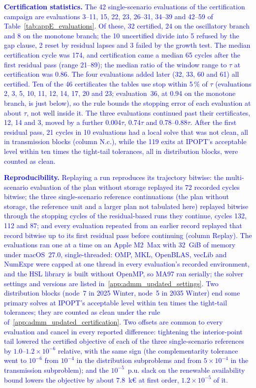 \textcolor{blue}{
    \textbf{Certification statistics.} The 42 single-scenario evaluations of the certification campaign are evaluations 3--11, 15, 22, 23, 26--31, 34--39 and 42--59 of Table~\ref{tab:appE_evaluations}. Of these, 32 certified, 24 on the oscillatory branch and 8 on the monotone branch; the 10 uncertified divide into 5 refused by the gap clause, 2 reset by residual lapses and 3 failed by the growth test. The median certification cycle was 174, and certification came a median 65 cycles after the first residual pass (range 21--89); the median ratio of the window range to $\tau$ at certification was 0.86. The four evaluations added later (32, 33, 60 and 61) all certified. Ten of the 46 certificates the tables use stop within 5\,\% of $\tau$ (evaluations 2, 3, 5, 10, 11, 12, 14, 17, 20 and 23; evaluation~36, at 0.94 on the monotone branch, is just below), so the rule bounds the stopping error of each evaluation at about $\tau$, not well inside it. The three evaluations continued past their certificates, 12, 14 and 3, moved by a further 0.004$\tau$, 0.74$\tau$ and 0.78--0.88$\tau$. After the first residual pass, 21 cycles in 10 evaluations had a local solve that was not clean, all in transmission blocks (column N.c.), while the 119 exits at IPOPT's acceptable level within ten times the tight-tail tolerances, all in distribution blocks, were counted as clean.
}

\textcolor{blue}{
    \textbf{Reproducibility.} Replaying a run reproduces its trajectory bitwise: the multi-scenario evaluation of the plan without storage replayed its 72 recorded cycles bitwise; the three single-scenario reference continuations (the plan without storage, the reference unit and a larger plan not tabulated here) replayed bitwise through the stopping cycles of the residual-based runs they continue, cycles 132, 112 and 87; and every evaluation repeated from an earlier record replayed that record bitwise up to its first residual pass before continuing (column Replay). The evaluations ran one at a time on an Apple M2~Max with 32~GiB of memory under macOS~27.0, single-threaded: OMP, MKL, OpenBLAS, vecLib and NumExpr were capped at one thread in every evaluation's recorded environment, and the HSL library is built without OpenMP, so MA97 ran serially; the solver settings and versions are listed in~\ref{app:admm_updated_settings}. Two distribution blocks (node~7 in 2025 Winter, node~5 in 2035 Winter) end some primary solves at IPOPT's acceptable level within ten times the tight-tail tolerances; they are counted as clean under the rule of~\ref{app:admm_updated_certification}. Two offsets are common to every evaluation and cancel in every reported difference: tightening the interior-point tail lowered the certified objective of each of the three single-scenario references by $1.0$--$1.2 \times 10^{-6}$ relative, with the same sign (the complementarity tolerance went to $10^{-6}$ from $10^{-4}$ in the distribution subproblems and from $5 \times 10^{-4}$ in the transmission subproblem); and the $10^{-5}$~p.u. slack on the renewable availability bound lowers the objective by about 7.8~k\euro{} at first order, $1.2 \times 10^{-5}$ of it.
}

